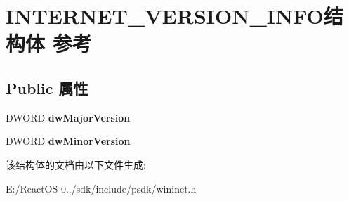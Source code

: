 \hypertarget{struct_i_n_t_e_r_n_e_t___v_e_r_s_i_o_n___i_n_f_o}{}\section{I\+N\+T\+E\+R\+N\+E\+T\+\_\+\+V\+E\+R\+S\+I\+O\+N\+\_\+\+I\+N\+F\+O结构体 参考}
\label{struct_i_n_t_e_r_n_e_t___v_e_r_s_i_o_n___i_n_f_o}
\subsection*{Public 属性}
\begin{DoxyCompactItemize}
\item 
\mbox{\label{struct_i_n_t_e_r_n_e_t___v_e_r_s_i_o_n___i_n_f_o_adcf05a5ac8f57a06f0954148e983fe8b}} 
D\+W\+O\+RD {\bfseries dw\+Major\+Version}
\item 
\mbox{\label{struct_i_n_t_e_r_n_e_t___v_e_r_s_i_o_n___i_n_f_o_a0004a2cc4411afbf916b5f7aae00c258}} 
D\+W\+O\+RD {\bfseries dw\+Minor\+Version}
\end{DoxyCompactItemize}


该结构体的文档由以下文件生成\+:\begin{DoxyCompactItemize}
\item 
E\+:/\+React\+O\+S-\/0../sdk/include/psdk/wininet.\+h\end{DoxyCompactItemize}
